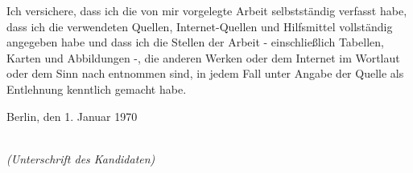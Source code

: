 \begin{large}

\vspace*{2cm}
\noindent
Ich versichere, dass ich die von mir vorgelegte Arbeit selbstständig verfasst habe, dass ich die verwendeten Quellen, Internet-Quellen und Hilfsmittel vollständig angegeben habe und dass ich die Stellen der Arbeit - einschließlich Tabellen, Karten und Abbildungen -, die anderen Werken oder dem Internet im Wortlaut oder dem Sinn nach entnommen sind, in jedem Fall unter Angabe der Quelle als Entlehnung kenntlich gemacht habe.\vspace{2cm}

\noindent
Berlin, den 1. Januar 1970

\vspace{3cm}

\hspace*{6cm}%
\dotfill\\
\hspace*{7cm}%
\textit{(Unterschrift des Kandidaten)}

\end{large}
